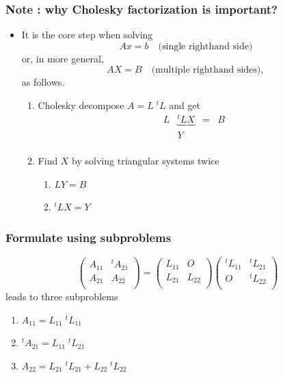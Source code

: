 \documentclass[12pt,dvipdfmx]{beamer}
\begin{document}
\begin{frame}
\frametitle{Note : why Cholesky factorization is important?}
\begin{itemize}
\item It is the core step when solving
\[ Ax = b \quad \mbox{(single righthand side)} \]
or, in more general,
\[ AX = B \quad \mbox{(multiple righthand sides)}, \]
as follows.
\begin{enumerate}
\item Cholesky decompose $A = L \; {}^tL$ and get
\[ 
\begin{array}{cccc}
L & \underbrace{{}^tL X} & = & B \\
  & Y                    &   &   \\
\end{array}
\]
\item Find $X$ by solving triangular systems twice
  \begin{enumerate}
  \item $L Y = B$
  \item ${}^tL X = Y$
  \end{enumerate}
\end{enumerate}
\end{itemize}
\end{frame}

\begin{frame}
\frametitle{Formulate using subproblems}

\[
\left(
\begin{array}{cc}
A_{11}     & {}^tA_{21} \\
A_{21}     & A_{22} \\
\end{array}
\right)
=
\left(
\begin{array}{cc}
L_{11}     & O     \\
L_{21} & L_{22} \\
\end{array}
\right)
\left(
\begin{array}{cc}
{}^tL_{11} & {}^tL_{21} \\
O         & {}^tL_{22} \\
\end{array}
\right)
\]
leads to three subproblems
\begin{enumerate}
\item $A_{11} = L_{11} \; {}^tL_{11}$
\item ${}^tA_{21} = L_{11} \; {}^tL_{21}$
\item $A_{22} = L_{21}\; {}^tL_{21} + L_{22} \; {}^tL_{22}$
\end{enumerate}


\end{frame}
\end{document}
